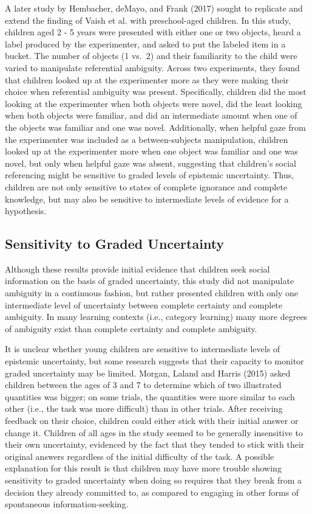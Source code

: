 \documentclass[floatsintext,man]{apa6}
\theoremstyle{definition}
\theoremstyle{definition}
\theoremstyle{definition}
\theoremstyle{remark}
\begin{document}
A later study by Hembacher, deMayo, and Frank (2017) sought to replicate
and extend the finding of Vaish et al. with preschool-aged children. In
this study, children aged 2 - 5 years were presented with either one or
two objects, heard a label produced by the experimenter, and asked to
put the labeled item in a bucket. The number of objects (1 vs.~2) and
their familiarity to the child were varied to manipulate referential
ambiguity. Across two experiments, they found that children looked up at
the experimenter more as they were making their choice when referential
ambiguity was present. Specifically, children did the most looking at
the experimenter when both objects were novel, did the least looking
when both objects were familiar, and did an intermediate amount when one
of the objects was familiar and one was novel. Additionally, when
helpful gaze from the experimenter was included as a between-subjects
manipulation, children looked up at the experimenter more when one
object was familiar and one was novel, but only when helpful gaze was
absent, suggesting that children's social referencing might be sensitive
to graded levels of epistemic uncertainty. Thus, children are not only
sensitive to states of complete ignorance and complete knowledge, but
may also be sensitive to intermediate levels of evidence for a
hypothesis.

\subsection{Sensitivity to Graded
Uncertainty}\label{sensitivity-to-graded-uncertainty}

Although these results provide initial evidence that children seek
social information on the basis of graded uncertainty, this study did
not manipulate ambiguity in a continuous fashion, but rather presented
children with only one intermediate level of uncertainty between
complete certainty and complete ambiguity. In many learning contexts
(i.e., category learning) many more degrees of ambiguity exist than
complete certainty and complete ambiguity.

It is unclear whether young children are sensitive to intermediate
levels of epistemic uncertainty, but some research suggests that their
capacity to monitor graded uncertainty may be limited. Morgan, Laland
and Harris (2015) asked children between the ages of 3 and 7 to
determine which of two illustrated quantities was bigger; on some
trials, the quantities were more similar to each other (i.e., the task
was more difficult) than in other trials. After receiving feedback on
their choice, children could either stick with their initial answer or
change it. Children of all ages in the study seemed to be generally
insensitive to their own uncertainty, evidenced by the fact that they
tended to stick with their original answers regardless of the initial
difficulty of the task. A possible explanation for this result is that
children may have more trouble showing sensitivity to graded uncertainty
when doing so requires that they break from a decision they already
committed to, as compared to engaging in other forms of spontaneous
information-seeking.
\end{document}
